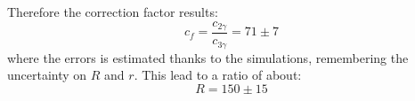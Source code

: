 \documentclass[main.tex]{subfiles}
\begin{document}
Therefore the correction factor results:
\begin{equation}
  c_f = \frac{c_{2\gamma}}{c_{3\gamma}} = 71\pm7
\end{equation}
where the errors is estimated thanks to the simulations, remembering the uncertainty on $R$ and $r$.
This lead to a ratio of about:
\begin{equation}
  R = 150 \pm 15
\end{equation}


\end{document}
